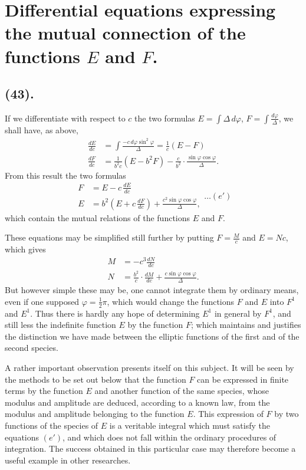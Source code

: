 \documentclass{article}
\begin{document}
\section*{Differential equations expressing the mutual connection of the functions $E$ and $F$.}

\subsection*{(43).}

If we differentiate with respect to $c$ the two formulas $E=\displaystyle\int\Delta\,d\varphi$, $F=\displaystyle\int\frac{d\varphi}{\Delta}$, we shall have, as above,
\[ \begin{aligned} \frac{dE}{dc}&=\int\frac{-c\,d\varphi\sin^{2}\varphi}{\Delta}=\frac{1}{c}(E-F)\\ \frac{dF}{dc}&=\frac{1}{b^{2}c}(E-b^{2}F)-\frac{c}{b^{2}}\cdot\frac{\sin\varphi\cos\varphi}{\Delta}. \end{aligned} \]
From this result the two formulas
\[ \begin{aligned} F&=E-c\,\frac{dE}{dc}\\ E&=b^{2}\left(E+c\,\frac{dF}{dc}\right)+\frac{c^{2}\sin\varphi\cos\varphi}{\Delta}, \end{aligned}\ldots(e') \]
which contain the mutual relations of the functions $E$ and $F$.


These equations may be simplified still further by putting $F=\frac{M}{c}$ and $E=Nc$, which gives
\[ \begin{aligned} M&=-c^{3}\frac{dN}{dc}\\ N&=\frac{b^{2}}{c}\cdot\frac{dM}{dc}+\frac{c\sin\varphi\cos\varphi}{\Delta}. \end{aligned} \]
But however simple these may be, one cannot integrate them by ordinary means, even if one supposed $\varphi=\frac{1}{2}\pi$, which would change the functions $F$ and $E$ into $F^{1}$ and $E^{1}$. Thus there is hardly any hope of determining $E^{1}$ in general by $F^{1}$, and still less the indefinite function $E$ by the function $F$; which maintains and justifies the distinction we have made between the elliptic functions of the first and of the second species.

A rather important observation presents itself on this subject. It will be seen by the methods to be set out below that the function $F$ can be expressed in finite terms by the function $E$ and another function of the same species, whose modulus and amplitude are deduced, according to a known law, from the modulus and amplitude belonging to the function $E$. This expression of $F$ by two functions of the species of $E$ is a veritable integral which must satisfy the equations $(e')$, and which does not fall within the ordinary procedures of integration. The success obtained in this particular case may therefore become a useful example in other researches.
\end{document}
